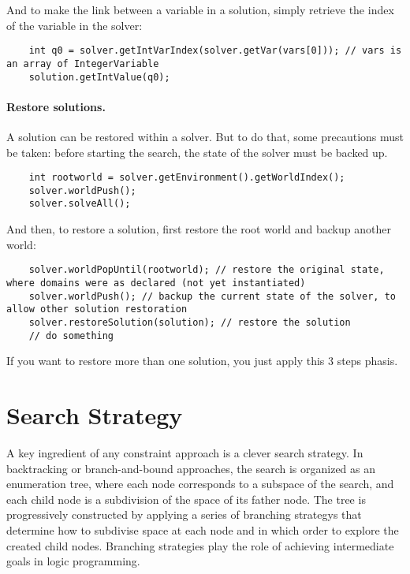 And to make the link between a variable in a solution, simply retrieve the index of the variable in the solver:
\begin{lstlisting}
	int q0 = solver.getIntVarIndex(solver.getVar(vars[0])); // vars is an array of IntegerVariable
	solution.getIntValue(q0);
\end{lstlisting}

\paragraph{Restore solutions.} A solution can be restored within a solver. But to do that, some precautions must be taken: before starting the search, the state of the solver must be backed up.
\begin{lstlisting}
	int rootworld = solver.getEnvironment().getWorldIndex();
	solver.worldPush();
	solver.solveAll();
\end{lstlisting}

And then, to restore a solution, first restore the root world and backup another world:
\begin{lstlisting}
	solver.worldPopUntil(rootworld); // restore the original state, where domains were as declared (not yet instantiated)
	solver.worldPush(); // backup the current state of the solver, to allow other solution restoration
	solver.restoreSolution(solution); // restore the solution
	// do something
\end{lstlisting}
If you want to restore more than one solution, you just apply this 3 steps phasis.


\section{Search Strategy}\label{solver:searchstrategy}\hypertarget{solver:searchstrategy}{}


A key ingredient of any constraint approach is a clever \gls{search strategy}. 
In backtracking or branch-and-bound approaches, the search is organized as an enumeration tree, where each node corresponds to a subspace of the search, and each child node is a subdivision of the space of its father node.
The tree is progressively constructed by applying a series of \glspl{branching strategy} that determine how to subdivise space at each node and in which order to explore the created child nodes. Branching strategies play the role of achieving intermediate goals in logic programming. 

